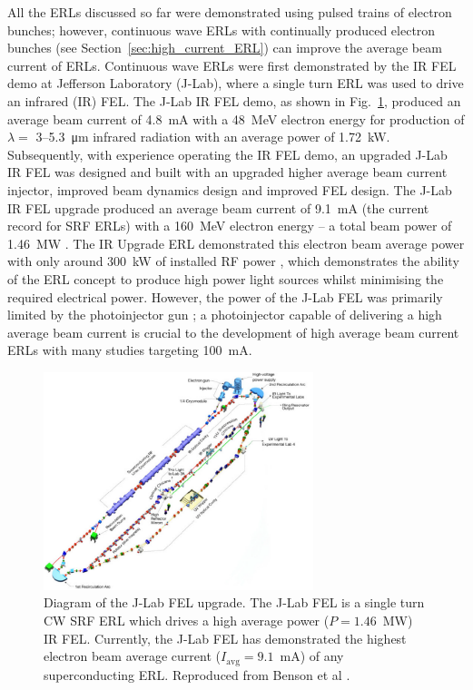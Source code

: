 \documentclass[../main.tex]{subfiles}
\begin{document}
All the ERLs discussed so far were demonstrated using pulsed trains of electron bunches; however, continuous wave ERLs with continually produced electron bunches (see Section~\ref{sec:high_current_ERL}) can improve the average beam current of ERLs. Continuous wave ERLs were first demonstrated \cite{neil2000sustained} by the IR FEL demo \cite{benson1999first,neil2000sustained} at Jefferson Laboratory (J-Lab), where a single turn ERL was used to drive an infrared (IR) FEL. The J-Lab IR FEL demo, as shown in Fig.~\ref{fig:J_Lab_FEL_diagram}, produced an average beam current of 4.8~\si{\milli\ampere} with a 48~\si{\mega\electronvolt} electron energy for production of $\lambda =$ 3--5.3~\si{\micro\meter} infrared radiation with an average power of 1.72~\si{\kilo\watt}. Subsequently, with experience operating the IR FEL demo, an upgraded J-Lab IR FEL was designed \cite{benson2002have} and built \cite{behre2004first} with an upgraded higher average beam current injector, improved beam dynamics design and improved FEL design. The J-Lab IR FEL upgrade produced an average beam current of 9.1~\si{\milli\ampere} (the current record for SRF ERLs) with a 160~\si{\mega\electronvolt} electron energy -- a total beam power of 1.46~\si{\mega\watt} \cite{neil2006jlab}. The IR Upgrade ERL demonstrated this electron beam average power with only around 300~\si{\kilo\watt} of installed RF power \cite{adolphsen2022european}, which demonstrates the ability of the ERL concept to produce high power light sources whilst minimising the required electrical power. However, the power of the J-Lab FEL was primarily limited by the photoinjector gun \cite{hannon2008high}; a photoinjector capable of delivering a high average beam current is crucial to the development of high average beam current ERLs with many studies \cite{hannon2008high,dunham2013record,neumann2013towards} targeting 100~\si{\milli\ampere}.   
\begin{figure}[!h]
\centering
\includegraphics[width=0.7\textwidth]{Figures/Introduction/JLab_FEL.pdf}
\caption{Diagram of the J-Lab FEL upgrade. The J-Lab FEL is a single turn CW SRF ERL which drives a high average power ($P = 1.46$~\si{\mega\watt}) IR FEL. Currently, the J-Lab FEL has demonstrated the highest electron beam average current ($I_{\mathrm{avg}} = 9.1$~\si{\milli\ampere}) of any superconducting ERL. Reproduced from Benson et al \cite{benson2009jlamp}.}
\label{fig:J_Lab_FEL_diagram}
\end{figure}
\end{document}
